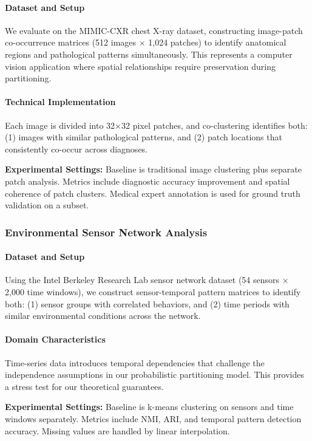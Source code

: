 \documentclass[journal]{IEEEtran}
\begin{document}
{        \paragraph{Dataset and Setup}
        We evaluate on the MIMIC-CXR chest X-ray dataset, constructing image-patch co-occurrence matrices (512 images $\times$ 1,024 patches) to identify anatomical regions and pathological patterns simultaneously. This represents a computer vision application where spatial relationships require preservation during partitioning.

        \paragraph{Technical Implementation}
        Each image is divided into 32$\times$32 pixel patches, and co-clustering identifies both: (1) images with similar pathological patterns, and (2) patch locations that consistently co-occur across diagnoses.

        \textbf{Experimental Settings:} Baseline is traditional image clustering plus separate patch analysis. Metrics include diagnostic accuracy improvement and spatial coherence of patch clusters. Medical expert annotation is used for ground truth validation on a subset.

        \subsubsection{Environmental Sensor Network Analysis}

        \paragraph{Dataset and Setup}
        Using the Intel Berkeley Research Lab sensor network dataset (54 sensors $\times$ 2,000 time windows), we construct sensor-temporal pattern matrices to identify both: (1) sensor groups with correlated behaviors, and (2) time periods with similar environmental conditions across the network.

        \paragraph{Domain Characteristics}
        Time-series data introduces temporal dependencies that challenge the independence assumptions in our probabilistic partitioning model. This provides a stress test for our theoretical guarantees.

        \textbf{Experimental Settings:} Baseline is k-means clustering on sensors and time windows separately. Metrics include NMI, ARI, and temporal pattern detection accuracy. Missing values are handled by linear interpolation.

}
\end{document}
